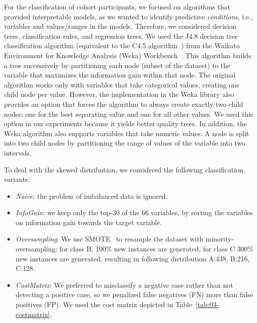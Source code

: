 \documentclass[
  oneside]{book}
\providecommand{\tightlist}{%
  \setlength{\itemsep}{0pt}\setlength{\parskip}{0pt}}
\begin{document}
For the classification of cohort participants, we focused on algorithms that provided interpretable models, as we wanted to identify predictive \emph{conditions}, i.e., variables and values/ranges in the models.
Therefore, we considered decision trees, classification rules, and regression trees.
We used the J4.8 decision tree classification algorithm (equivalent to the C4.5 algorithm~\autocite{Q92}) from the Waikato Environment for Knowledge Analysis (Weka) Workbench~\autocite{FrankEtAl:Weka2016}.
This algorithm builds a tree successively by partitioning each node (subset of the dataset) to the variable that maximizes the information gain within that node.
The original algorithm works only with variables that take categorical values, creating one child node per value.
However, the implementation in the Weka library also provides an option that forces the algorithm to always create exactly two child nodes: one for the best separating value and one for all other values.
We used this option in our experiments because it yields better quality trees.
In addition, the Weka algorithm also supports variables that take numeric values:
A node is split into two child nodes by partitioning the range of values of the variable into two intervals.

To deal with the skewed distribution, we considered the following classification variants:

\begin{itemize}
\tightlist
\item
  \emph{Naive}: the problem of imbalanced data is ignored.
\item
  \emph{InfoGain}: we keep only the top-30 of the 66 variables, by sorting the variables on information gain towards the target variable.
\item
  \emph{Oversampling}: We use SMOTE~\autocite{CBHea02} to resample the dataset with minority-oversampling: for class B, 100\% new instances are generated, for class C 300\% new instances are generated, resulting in following distribution A:438, B:216, C:128.
\item
  \emph{CostMatrix}: We preferred to misclassify a negative case rather than not detecting a positive case, so we penalized false negatives (FN) more than false positives (FP).
  We used the cost matrix depicted in Table~\ref{tab:03-costmatrix}.
\end{itemize}
\end{document}
